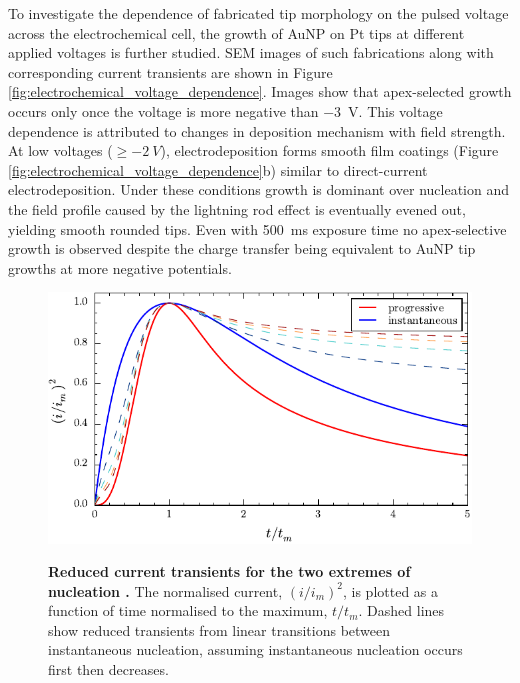 \documentclass{article}
\begin{document}
To investigate the dependence of fabricated tip morphology on the pulsed voltage across the electrochemical cell, the growth of AuNP on Pt tips at different applied voltages is further studied. SEM images of such fabrications along with corresponding current transients are shown in Figure \ref{fig:electrochemical_voltage_dependence}. Images show that apex-selected growth occurs only once the voltage is more negative than \SI{-3}{V}. This voltage dependence is attributed to changes in deposition mechanism with field strength.
At low voltages ($\geq \SI{-2}{V}$), electrodeposition forms smooth film coatings (Figure \ref{fig:electrochemical_voltage_dependence}b) similar to direct-current electrodeposition. Under these conditions growth is dominant over nucleation and the field profile caused by the lightning rod effect is eventually evened out, yielding smooth rounded tips. Even with \SI{500}{ms} exposure time no apex-selective growth is observed despite the charge transfer being equivalent to AuNP tip growths at more negative potentials.

\begin{figure}[bt]
\centering
{\includegraphics{figures/nucleation_theory}}
{\caption[Reduced current transients for the two extremes of nucleation \cite{sharifker1983}.]{\textbf{Reduced current transients for the two extremes of nucleation \cite{sharifker1983}.} The normalised current, $(i/i_m)^2$, is plotted as a function of time normalised to the maximum, $t/t_m$. Dashed lines show reduced transients from linear transitions between instantaneous nucleation, assuming instantaneous nucleation occurs first then decreases.}
\label{fig:nucleation_theory}}
\vspace{-5pt}
\end{figure}
\end{document}
